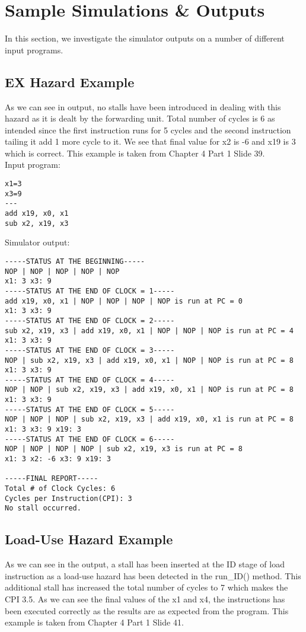 \chapter{Sample Simulations \& Outputs}
\noindent In this section, we investigate the simulator outputs on a number of different input programs.

\section{EX Hazard Example}
As we can see in output, no stalls have been introduced in dealing with this hazard as it is dealt by the forwarding unit. Total number of cycles is 6 as intended since the first instruction runs for 5 cycles and the second instruction tailing it add 1 more cycle to it. We see that final value for x2 is -6 and x19 is 3 which is correct. This example is taken from Chapter 4 Part 1 Slide 39.
\\

\noindent Input program:
\vspace{0.5 cm}
\begin{lstlisting}
x1=3
x3=9
---
add x19, x0, x1
sub x2, x19, x3
\end{lstlisting}
\vspace{0.5 cm}
Simulator output:
\vspace{0.5 cm}
\begin{lstlisting}
-----STATUS AT THE BEGINNING-----
NOP | NOP | NOP | NOP | NOP
x1: 3 x3: 9 
-----STATUS AT THE END OF CLOCK = 1-----
add x19, x0, x1 | NOP | NOP | NOP | NOP is run at PC = 0
x1: 3 x3: 9 
-----STATUS AT THE END OF CLOCK = 2-----
sub x2, x19, x3 | add x19, x0, x1 | NOP | NOP | NOP is run at PC = 4
x1: 3 x3: 9 
-----STATUS AT THE END OF CLOCK = 3-----
NOP | sub x2, x19, x3 | add x19, x0, x1 | NOP | NOP is run at PC = 8
x1: 3 x3: 9 
-----STATUS AT THE END OF CLOCK = 4-----
NOP | NOP | sub x2, x19, x3 | add x19, x0, x1 | NOP is run at PC = 8
x1: 3 x3: 9 
-----STATUS AT THE END OF CLOCK = 5-----
NOP | NOP | NOP | sub x2, x19, x3 | add x19, x0, x1 is run at PC = 8
x1: 3 x3: 9 x19: 3 
-----STATUS AT THE END OF CLOCK = 6-----
NOP | NOP | NOP | NOP | sub x2, x19, x3 is run at PC = 8
x1: 3 x2: -6 x3: 9 x19: 3 

-----FINAL REPORT-----
Total # of Clock Cycles: 6
Cycles per Instruction(CPI): 3
No stall occurred.
\end{lstlisting}

\section{Load-Use Hazard Example}
As we can see in the output, a stall has been inserted at the ID stage of load instruction as a load-use hazard has been detected in the run\_ID() method. This additional stall has increased the total number of cycles to 7 which makes the CPI 3.5. As we can see the final values of the x1 and x4, the instructions has been executed correctly as the results are as expected from the program. This example is taken from Chapter 4 Part 1 Slide 41.
\\

